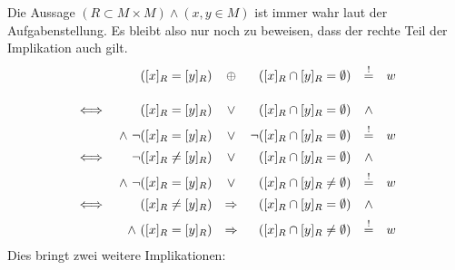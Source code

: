 \documentclass[10pt, oneside]{article}
\begin{document}
Die Aussage $(R \subset M \times M) \land (x, y \in M)$ ist immer wahr laut der
Aufgabenstellung. Es bleibt also nur noch zu beweisen, dass der rechte Teil
der Implikation auch gilt.
\begin{equation*}
    \begin{array}{rrcrcl}
                         &([x]_R = [y]_R) &\oplus&           ([x]_R \cap [y]_R    = \emptyset) &\overset{!}{=}& w \\[15pt]
        \iff             &([x]_R = [y]_R) &\lor&           ([x]_R \cap [y]_R    = \emptyset) &\land& \\[5pt]
             &\land\ \lnot([x]_R = [y]_R) &\lor&      \lnot([x]_R \cap [y]_R    = \emptyset) &\overset{!}{=}& w \\[5pt]
        \iff &\lnot([x]_R \neq [y]_R)     &\lor&           ([x]_R \cap [y]_R    = \emptyset) &\land& \\[5pt]
             &\land\ \lnot([x]_R = [y]_R) &\lor&           ([x]_R \cap [y]_R \neq \emptyset) &\overset{!}{=}& w \\[5pt]
        \iff             &([x]_R \neq [y]_R) &\Rightarrow& ([x]_R \cap [y]_R    = \emptyset) &\land& \\[5pt]
                  &\land\ ([x]_R = [y]_R)    &\Rightarrow& ([x]_R \cap [y]_R \neq \emptyset) &\overset{!}{=}& w
     \end{array}
\end{equation*}
Dies bringt zwei weitere Implikationen:
\end{document}
